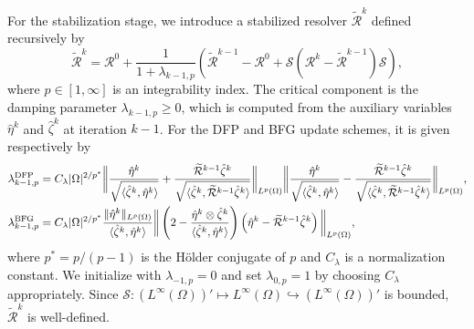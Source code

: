 \documentclass[onefignum,onetabnum]{siamart190516}
\numberwithin{equation}{section}
\begin{document}
For the stabilization stage, we introduce a stabilized resolver $\widetilde{\mathcal{R}}^{k}$ defined recursively by
\begin{equation}\label{eqn26}
\widetilde{\mathcal{R}}^{k} = \mathcal{R}^{0} + \frac{1}{1 + \lambda_{k-1,p}}\left(\widetilde{\mathcal{R}}^{k-1}-\mathcal{R}^{0}+\mathcal{S}\left(\mathcal{R}^{k}-\widetilde{\mathcal{R}}^{k-1}\right)\mathcal{S}\right),
\end{equation}
where $p \in [1, \infty]$ is an integrability index.
The critical component is the damping parameter $\lambda_{k-1,p} \geq 0$, which is computed from the auxiliary variables $\hat{\eta}^k$ and $\hat{\zeta}^k$ at iteration $k-1$.
For the DFP and BFG update schemes, it is given respectively by
\begin{equation}\label{eqn33}
\begin{aligned}
\lambda_{k-1,p}^{\rm DFP} &=
C_{\lambda}|\Omega|^{2/p^{*}}\bigg\| \frac{\hat{\eta}^k}{\sqrt{\langle \hat{\zeta}^k, \hat{\eta}^k \rangle}} + \frac{\widetilde{\mathcal{R}}^{k-1} \hat{\zeta}^k}{\sqrt{\langle \hat{\zeta}^k, \widetilde{\mathcal{R}}^{k-1} \hat{\zeta}^k \rangle}} \bigg\|_{L^{p}(\Omega)} \bigg\| \frac{\hat{\eta}^k}{\sqrt{\langle \hat{\zeta}^k, \hat{\eta}^k \rangle}} - \frac{\widetilde{\mathcal{R}}^{k-1} \hat{\zeta}^k}{\sqrt{\langle \hat{\zeta}^k, \widetilde{\mathcal{R}}^{k-1} \hat{\zeta}^k \rangle}} \bigg\|_{L^{p}(\Omega)},\\
\lambda_{k-1,p}^{\rm BFG} &=
C_{\lambda}|\Omega|^{2/p^{*}}\frac{\|\hat{\eta}^k\|_{L^{p}(\Omega)}}{\langle \hat{\zeta}^k, \hat{\eta}^k \rangle}  \bigg\| \left( 2 - \frac{\hat{\eta}^k \otimes \hat{\zeta}^k}{\langle \hat{\zeta}^k, \hat{\eta}^k \rangle} \right) \left( \hat{\eta}^k - \widetilde{\mathcal{R}}^{k-1} \hat{\zeta}^k \right) \bigg\|_{L^{p}(\Omega)},
\end{aligned}
\end{equation}
where $p^{*} = p/(p-1)$ is the H\"older conjugate of $p$ and $C_{\lambda}$ is a normalization constant.
We initialize with $\lambda_{-1,p} = 0$ and set $\lambda_{0,p} = 1$ by choosing $C_{\lambda}$ appropriately.
Since $\mathcal{S}:(L^\infty(\Omega))'\mapsto L^\infty(\Omega)\hookrightarrow (L^\infty(\Omega))'$ is bounded, $\widetilde{\mathcal{R}}^{k}$ is well-defined.
\end{document}
